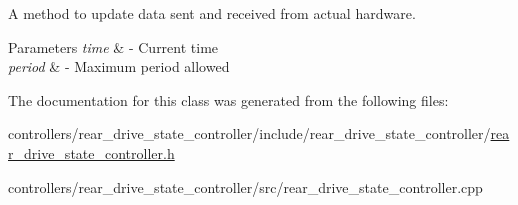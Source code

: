 A method to update data sent and received from actual hardware. 


\begin{DoxyParams}{Parameters}
{\em time} & -\/ Current time \\
\hline
{\em period} & -\/ Maximum period allowed \\
\hline
\end{DoxyParams}


The documentation for this class was generated from the following files\+:\begin{DoxyCompactItemize}
\item 
controllers/rear\+\_\+drive\+\_\+state\+\_\+controller/include/rear\+\_\+drive\+\_\+state\+\_\+controller/\hyperlink{rear__drive__state__controller_8h}{rear\+\_\+drive\+\_\+state\+\_\+controller.\+h}\item 
controllers/rear\+\_\+drive\+\_\+state\+\_\+controller/src/rear\+\_\+drive\+\_\+state\+\_\+controller.\+cpp\end{DoxyCompactItemize}
